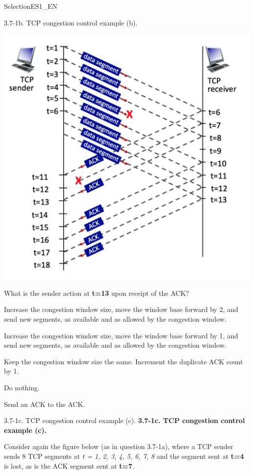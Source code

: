 \documentclass[a4paper]{article}
\begin{document}
\begin{quiz}{SelectionES1\_EN}
\begin{multi}[points=1,shuffle]{3.7-1b. TCP congestion control example (b).}
\begin{center}
	\includegraphics[width=\linewidth]{figs/tcp_seq_ack_1.jpg}
\end{center}

What is the sender action at \textbf{t=13} upon receipt of the ACK?
\item* Increase the congestion window size, move the window base forward by 2, and send new segments, as available and as allowed by the congestion window.
\item Increase the congestion window size, move the window base forward by 1, and send new segments, as available and as allowed by the congestion window.
\item Keep the congestion window size the same. Increment the duplicate ACK count by 1.
\item Do nothing.
\item Send an ACK to the ACK.
\end{multi}

\begin{multi}[points=1,shuffle]{3.7-1c. TCP congestion control example (c).}
\textbf{3.7-1c. TCP congestion control example (c).}

Consider again the figure below (as in question 3.7-1a), where a TCP sender sends 8 TCP segments at \emph{t = 1, 2, 3, 4, 5, 6, 7, 8} and the segment sent at \textbf{t=4} is lost, as is the ACK segment sent at \textbf{t=7}. 


\end{multi}
\end{quiz}
\end{document}
